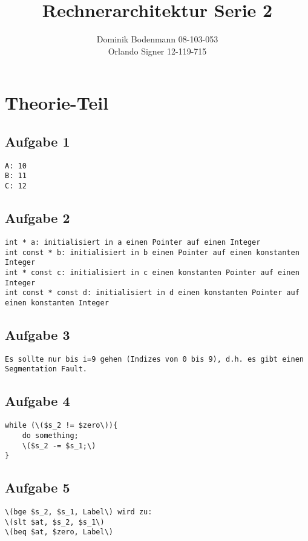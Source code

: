\documentclass[a4paper,abstracton]{scrartcl}
\title{Rechnerarchitektur Serie 2}
\author{Dominik Bodenmann 08-103-053\\
	Orlando Signer 12-119-715\\}
\begin{document}
\maketitle

\section{Theorie-Teil}
\subsection{Aufgabe 1}
\begin{lstlisting}[caption=Ausgabe]
A: 10
B: 11
C: 12
\end{lstlisting}

\subsection{Aufgabe 2}
\begin{lstlisting}[caption=Eigenschaften]
int * a: initialisiert in a einen Pointer auf einen Integer
int const * b: initialisiert in b einen Pointer auf einen konstanten Integer
int * const c: initialisiert in c einen konstanten Pointer auf einen Integer
int const * const d: initialisiert in d einen konstanten Pointer auf einen konstanten Integer
\end{lstlisting}

\subsection{Aufgabe 3}
\begin{lstlisting}[caption=Problem]
Es sollte nur bis i=9 gehen (Indizes von 0 bis 9), d.h. es gibt einen Segmentation Fault.
\end {lstlisting}

\subsection{Aufgabe 4}
\begin{lstlisting}[caption=C-Code]
while (\($s_2 != $zero\)){
	do something;
	\($s_2 -= $s_1;\)
}
\end{lstlisting}

\subsection{Aufgabe 5}
\begin{lstlisting}[caption=Erweiterung]
\(bge $s_2, $s_1, Label\) wird zu:
\(slt $at, $s_2, $s_1\)
\(beq $at, $zero, Label\)
\end{lstlisting}
\end{document}
